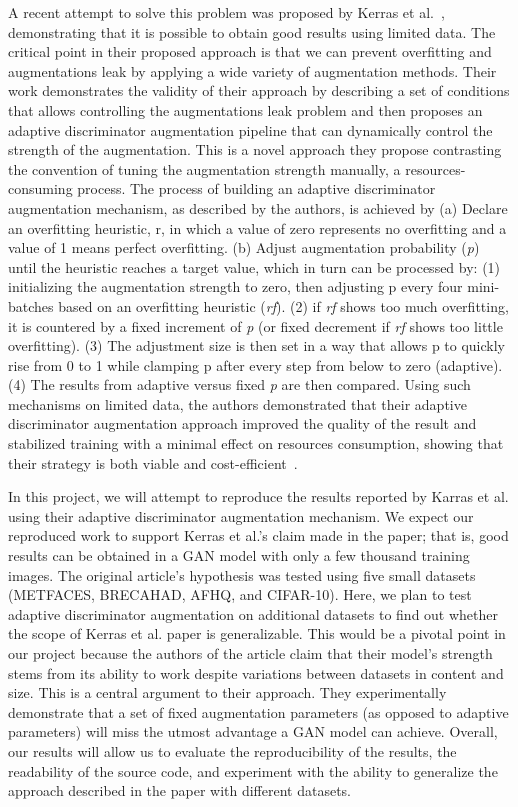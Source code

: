 \documentclass{report}
\begin{document}
A recent attempt to solve this problem was proposed by Kerras et al.~\cite{karras2020training}, demonstrating that it is possible to obtain good results using limited data. The critical point in their proposed approach is that we can prevent overfitting and augmentations leak by applying a wide variety of augmentation methods. Their work demonstrates the validity of their approach by describing a set of conditions that allows controlling the augmentations leak problem and then proposes an adaptive discriminator augmentation pipeline that can dynamically control the strength of the augmentation. This is a novel approach they propose contrasting the convention of tuning the augmentation strength manually, a resources-consuming process. The process of building an adaptive discriminator augmentation mechanism, as described by the authors, is achieved by 
(a) Declare an overfitting heuristic, r, in which a value of zero represents no overfitting and a value of 1 means perfect overfitting.
(b) Adjust augmentation probability (\textit{p}) until the heuristic reaches a target value, which in turn can be processed by:
(1) initializing the augmentation strength to zero, then adjusting p every four mini-batches based on an overfitting heuristic (\textit{rf}).
(2) if \textit{rf} shows too much overfitting, it is countered by a fixed increment of \textit{p} (or fixed decrement if \textit{rf} shows too little overfitting).
(3) The adjustment size is then set in a way that allows p to quickly rise from 0 to 1 while clamping p after every step from below to zero (adaptive).
(4) The results from adaptive versus ﬁxed \textit{p} are then compared.
Using such mechanisms on limited data, the authors demonstrated that their adaptive discriminator augmentation approach improved the quality of the result and stabilized training with a minimal effect on resources consumption, showing that their strategy is both viable and cost-efficient~\cite{karras2020training}.


In this project, we will attempt to reproduce the results reported by Karras et al. using their adaptive discriminator augmentation mechanism. We expect our reproduced work to support Kerras et al.'s claim made in the paper; that is, good results can be obtained in a GAN model with only a few thousand training images. The original article's hypothesis was tested using five small datasets (METFACES, BRECAHAD, AFHQ, and CIFAR-10). Here, we plan to test adaptive discriminator augmentation on additional datasets to find out whether the scope of Kerras et al. paper is generalizable. This would be a pivotal point in our project because the authors of the article claim that their model's strength stems from its ability to work despite variations between datasets in content and size. This is a central argument to their approach. They experimentally demonstrate that a set of ﬁxed augmentation parameters (as opposed to adaptive parameters) will miss the utmost advantage a GAN model can achieve. Overall, our results will allow us to evaluate the reproducibility of the results, the readability of the source code, and experiment with the ability to generalize the approach described in the paper with different datasets.
\end{document}
